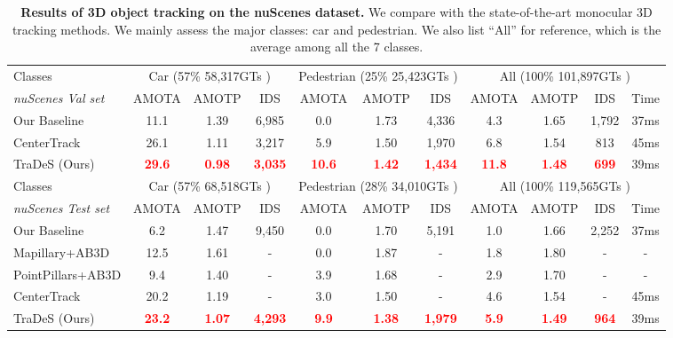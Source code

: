 \documentclass[final]{cvpr}
\begin{document}
\begin{table*}[!htb]
	\begin{center}	
		\setlength{\tabcolsep}{3.25pt}
\small
		\begin{tabular}{l|ccc|ccc|cccc }
			\shline
			\rowcolor{mygray}
			Classes&\multicolumn{3}{c|}{Car (57\% \tiny 58,317GTs \small)}&\multicolumn{3}{c|}{Pedestrian (25\% \tiny 25,423GTs \small)}&\multicolumn{4}{c}{All (100\% \tiny 101,897GTs \small)}\\
			\rowcolor{mygray}
			\emph{nuScenes Val set}&AMOTA&AMOTP&IDS& AMOTA&AMOTP&IDS&AMOTA&AMOTP&IDS&Time \\ 
			\hline \hline
			Our Baseline&11.1&1.39&6,985&0.0&1.73&4,336&4.3&1.65&1,792&37ms \\	
			CenterTrack\cite{CenterTrack}&26.1&1.11&3,217&5.9&1.50&1,970&6.8&1.54&813&45ms \\		
			TraDeS (Ours)&\textcolor{red}{\bf29.6}&\textcolor{red}{\bf0.98} &\textcolor{red}{\bf3,035}&\textcolor{red}{\bf10.6}&\textcolor{red}{\bf1.42}&\textcolor{red}{\bf1,434} &\textcolor{red}{\bf11.8}&\textcolor{red}{\bf1.48}&\textcolor{red}{\bf699}&39ms \\		
			\shline
			\rowcolor{mygray}
			Classes&\multicolumn{3}{c|}{Car (57\% \tiny 68,518GTs \small)}&\multicolumn{3}{c|}{Pedestrian (28\% \tiny 34,010GTs \small)}&\multicolumn{4}{c}{All (100\% \tiny 119,565GTs \small)} \\
			\rowcolor{mygray}
			\emph{nuScenes Test set}&AMOTA&AMOTP&IDS  &AMOTA&AMOTP&IDS&AMOTA&AMOTP&IDS&Time\\ 
			\hline \hline
			Our Baseline&6.2&1.47&9,450&0.0&1.70&5,191&1.0&1.66&2,252&37ms \\
			Mapillary\cite{simonelli2019disentangling}+AB3D\cite{Weng2019_3dmot}&12.5&1.61&-&0.0&1.87&-&1.8&1.80&-&- \\
			PointPillars\cite{lang2019pointpillars}+AB3D\cite{Weng2019_3dmot}&9.4&1.40&-&3.9&1.68&-&2.9&1.70&-&- \\
			CenterTrack\cite{CenterTrack}&20.2&1.19&-&3.0&1.50&-&4.6&1.54&-&45ms \\		
			TraDeS (Ours)&\textcolor{red}{\bf23.2}&\textcolor{red}{\bf1.07}&\textcolor{red}{\bf4,293}&\textcolor{red}{\bf9.9}&\textcolor{red}{\bf1.38}&\textcolor{red}{\bf1,979}&\textcolor{red}{\bf5.9}&\textcolor{red}{\bf1.49}&\textcolor{red}{\bf964} &39ms \\		
			\hline
		\end{tabular}
	\vspace{-2mm}	
	\end{center}
	\caption{\textbf{Results of 3D object tracking on the nuScenes dataset.} We compare with the state-of-the-art monocular 3D tracking methods. We mainly assess the major classes: car and pedestrian. We also list ``All'' for reference, which is the average among all the 7 classes.}
	\label{tab:nuscenes_sota}
	\vspace{-2mm}
\end{table*}
\end{document}
